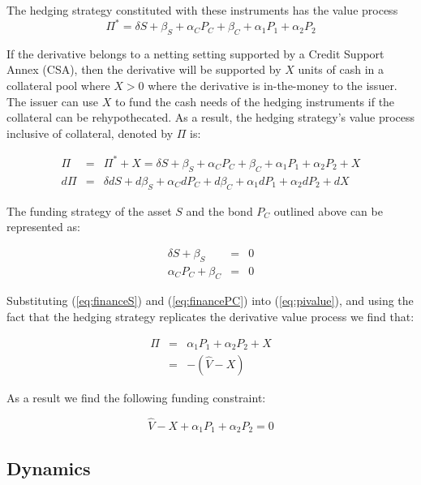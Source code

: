 \documentclass{tufte-handout}
\begin{document}
The hedging strategy constituted with these instruments has the value process
\begin{equation}
  \Pi^* = \delta S + \beta_S + \alpha_C P_C + \beta_C + \alpha_1 P_1 + \alpha_2 P_2
\end{equation}

If the derivative belongs to a netting setting supported by a Credit Support
Annex (CSA), then the derivative will be supported by $X$ units of cash in
a collateral pool where $X>0$ where the derivative is in-the-money to the issuer.
The issuer can use $X$ to fund the cash needs of the hedging instruments if
the collateral can be rehypothecated. As a result, the hedging strategy's value
process inclusive of collateral, denoted by $\Pi$ is:

\begin{eqnarray}
  \Pi & = & \Pi^* + X = \delta S + \beta_S + \alpha_C P_C + \beta_C +
          \alpha_1 P_1 + \alpha_2 P_2 + X \label{eq:pivalue} \\
  d\Pi & = & \delta dS + d\beta_S + \alpha_C dP_C + d\beta_C +
          \alpha_1 dP_1 + \alpha_2 dP_2 + dX \label{eq:pidelta}
\end{eqnarray}

The funding strategy of the asset $S$ and the bond $P_C$ outlined above can be
represented as:

\begin{eqnarray}
  \delta S + \beta_S & = & 0 \label{eq:financeS} \\
  \alpha_C P_C + \beta_C & = & 0 \label{eq:financePC}
\end{eqnarray}

Substituting (\ref{eq:financeS}) and (\ref{eq:financePC}) into (\ref{eq:pivalue}),
and using the fact that the hedging strategy replicates the derivative value
process we find that:

\begin{eqnarray*}
  \Pi & = & \alpha_1 P_1 + \alpha_2 P_2 + X \\
      & = & -(\hat{V} - X)
\end{eqnarray*}

As a result we find the following funding constraint:

\begin{equation}\label{eq:fundingconstraint}
  \hat{V} - X + \alpha_1 P_1 + \alpha_2 P_2 = 0
\end{equation}


\subsection{Dynamics}\label{sec:dynamics}
\end{document}
